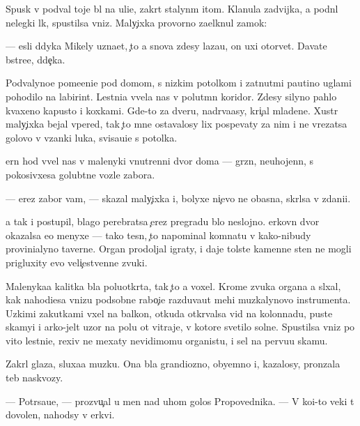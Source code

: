 \documentclass[10pt]{book}
\begin{document}
Spusk v podval toje b{\yi}l na uli{\q}e, zakr{\yi}t{\yi}{\y} stalyn{\yi}m {\x}itom. Kla{\q}nula zadvijka, {\y}a podn{\ia}l nelegki{\y} l{\iu}k, spustilsa vniz. Maly{\c}ixka provorno za{\x}elknul zamok:

— {\Y}esli d{\ia}dyka Mikely uzna{\y}et, {\c}to {\y}a snova zdesy laza{\y}u, on uxi otorvet. Dava{\y}te b{\yi}stre{\y}e, d{\ia}de{\c}ka.

Podvalyno{\y}e pome{\x}eni{\y}e pod domom, s nizkim potolkom i zat{\ia}nut{\yi}mi pautino{\y} uglami pohodilo na labirint. Lestni{\q}a v{\yi}vela nas v polut{\e}mn{\yi}{\y} koridor. Zdesy silyno pahlo kvaxeno{\y} kapusto{\y} i koxkami. Gde-to za dver{\y}u, nadr{\yi}va{\y}asy, kri{\c}al mladene{\q}. Xustr{\yi}{\y} maly{\c}ixka bejal vpered, tak {\c}to mne ostavalosy lix pospevaty za nim i ne vrezatsa golovo{\y} v v{\ia}zanki luka, svisa{\y}u{\x}i{\y}e s potolka.

{\C}ern{\yi}{\y} hod v{\yi}vel nas v malenyki{\y} vnutrenni{\y} dvor doma — gr{\ia}zn{\yi}{\y}, neuhojenn{\yi}{\y}, s pokosivxe{\y}sa golub{\ia}tne{\y} vozle zabora.

— {\C}erez zabor vam, — skazal maly{\c}ixka i, bolyxe ni{\c}evo ne ob{\y}asn{\ia}{\y}a, skr{\yi}lsa v zdani{\y}i.

{\Y}a tak i postupil, blago perebratsa {\c}erez pregradu b{\yi}lo neslojno. {\Q}erkovn{\yi}{\y} dvor okazalsa {\y}e{\x}o menyxe — tako{\y} tesn{\yi}{\y}, {\c}to napominal komnatu v kako{\y}-nibudy provin{\q}ialyno{\y} taverne. Organ prodoljal igraty, i daje tolst{\yi}{\y}e kamenn{\yi}{\y}e sten{\yi} ne mogli prigluxity {\y}evo veli{\c}estvenn{\yi}{\y}e zvuki.

Malenyka{\y}a kalitka b{\yi}la poluotkr{\yi}ta, tak {\c}to {\y}a voxel. Krome zvuka organa {\y}a sl{\yi}xal, kak nahod{\ia}{\x}i{\y}esa vnizu podsobn{\yi}{\y}e rabo{\c}i{\y}e razduva{\y}ut mehi muz{\yi}kalynovo instrumenta. Uzkimi zakutkami v{\yi}xel na balkon, otkuda otkr{\yi}valsa vid na kolonnadu, pust{\yi}{\y}e skamyi i {\y}arko-jelt{\yi}{\y} uzor na polu ot vitraje{\y}, v kotor{\yi}{\y}e svetilo soln{\q}e. Spustilsa vniz po vito{\y} lestni{\q}e, rexiv ne mexaty nevidimomu organistu, i sel na pervu{\y}u skam{\y}u.

Zakr{\yi}l glaza, sluxa{\y}a muz{\yi}ku. Ona b{\yi}la grandiozno{\y}, obyemno{\y} i, kazalosy, pronzala teb{\ia} naskvozy.

— Potr{\ia}sa{\y}u{\x}e, — prozvu{\c}al u men{\ia} nad uhom golos Propovednika. — V ko{\y}i-to veki t{\yi} dovolen, nahod{\ia}sy v {\q}erkvi.
\end{document}
